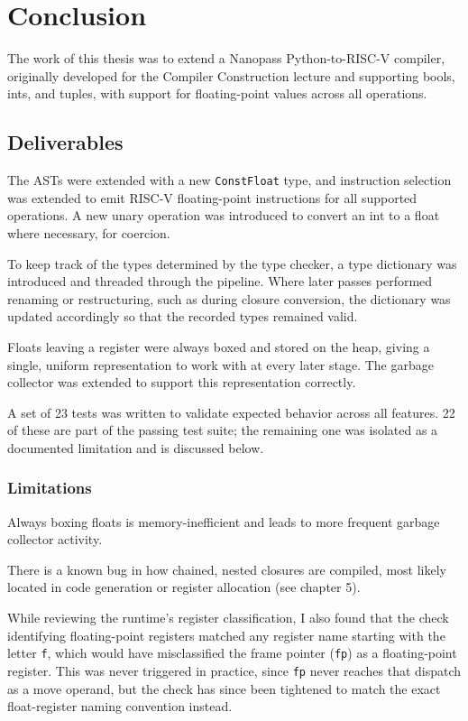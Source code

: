 \chapter{Conclusion}\label{chap:conclusion}

The work of this thesis was to extend a Nanopass Python-to-RISC-V compiler, originally developed for the Compiler Construction lecture and supporting bools, ints, and tuples, with support for floating-point values across all operations.

\section{Deliverables}

The ASTs were extended with a new \texttt{ConstFloat} type, and instruction selection was extended to emit RISC-V floating-point instructions for all supported operations. A new unary operation was introduced to convert an int to a float where necessary, for coercion.

To keep track of the types determined by the type checker, a type dictionary was introduced and threaded through the pipeline. Where later passes performed renaming or restructuring, such as during closure conversion, the dictionary was updated accordingly so that the recorded types remained valid.

Floats leaving a register were always boxed and stored on the heap, giving a single, uniform representation to work with at every later stage. The garbage collector was extended to support this representation correctly.

A set of 23 tests was written to validate expected behavior across all features. 22 of these are part of the passing test suite; the remaining one was isolated as a documented limitation and is discussed below.

\subsection{Limitations}

Always boxing floats is memory-inefficient and leads to more frequent garbage collector activity.

There is a known bug in how chained, nested closures are compiled, most likely located in code generation or register allocation (see chapter 5).

While reviewing the runtime's register classification, I also found that the check identifying floating-point registers matched any register name starting with the letter \texttt{f}, which would have misclassified the frame pointer (\texttt{fp}) as a floating-point register. This was never triggered in practice, since \texttt{fp} never reaches that dispatch as a move operand, but the check has since been tightened to match the exact float-register naming convention instead.

